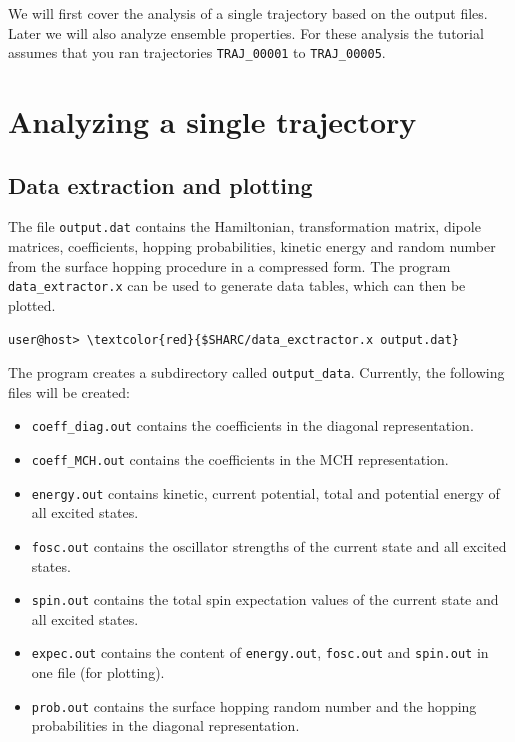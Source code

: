 \documentclass[a4paper,11pt,DIV=15,openany]{scrbook}
\newcommand{\ttt}[1]{\texttt{#1}}
\begin{document}


We will first cover the analysis of a single trajectory based on the output files. Later we will also analyze ensemble properties. For these analysis the tutorial assumes that you ran trajectories \ttt{TRAJ\_00001} to \ttt{TRAJ\_00005}.

\section{Analyzing a single trajectory}

\subsection{Data extraction and plotting}

The file \ttt{output.dat} contains the Hamiltonian, transformation matrix, dipole matrices, coefficients, hopping probabilities, kinetic energy and random number from the surface hopping procedure in a compressed form. The program \ttt{data\_extractor.x} can be used to generate data tables, which can then be plotted.
\begin{Verbatim}[commandchars=\\\{\}]
user@host> \textcolor{red}{$SHARC/data_exctractor.x output.dat}
\end{Verbatim}
The program creates a subdirectory called \ttt{output\_data}. Currently, the following files will be created:
\begin{itemize}
  \item \ttt{coeff\_diag.out} contains the coefficients in the diagonal representation.
  \item \ttt{coeff\_MCH.out} contains the coefficients in the MCH representation.
  \item \ttt{energy.out} contains kinetic, current potential, total and potential energy of all excited states.
  \item \ttt{fosc.out} contains the oscillator strengths of the current state and all excited states.
  \item \ttt{spin.out} contains the total spin expectation values of the current state and all excited states.
  \item \ttt{expec.out} contains the content of \ttt{energy.out}, \ttt{fosc.out} and \ttt{spin.out} in one file (for plotting).
  \item \ttt{prob.out} contains the surface hopping random number and the hopping probabilities in the diagonal representation.
\end{itemize}
\end{document}
